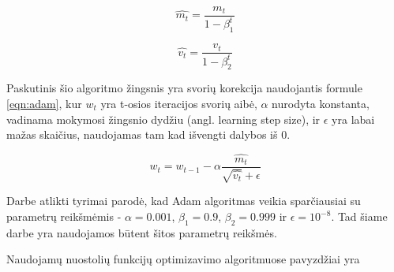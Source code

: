 \begin{equation}
\label{eqn:corr_m_t}
	\hat{m_t} = \dfrac{m_t}{1 - \beta_1^t}
\end{equation}

\begin{equation}
\label{eqn:corr_v_t}
	\hat{v_t} = \dfrac{v_t}{1 - \beta_2^t}
\end{equation}

Paskutinis šio algoritmo žingsnis yra svorių korekcija naudojantis formule \ref{eqn:adam}, kur $w_t$ yra t-osios iteracijos svorių aibė, $\alpha$ nurodyta konstanta, vadinama mokymosi žingsnio dydžiu (angl. learning step size), ir $\epsilon$ yra labai mažas skaičius, naudojamas tam kad išvengti dalybos iš 0.

\begin{equation}
\label{eqn:adam}
	w_t = w_{t-1} - \alpha \dfrac{\hat{m_t}}{\sqrt{\hat{v_t}} + \epsilon}
\end{equation}

Darbe \cite{adam} atlikti tyrimai parodė, kad Adam algoritmas veikia sparčiausiai su parametrų reikšmėmis - $\alpha = 0.001$, $\beta_1 = 0.9$, $\beta_2 = 0.999$ ir $\epsilon = 10^{-8}$. Tad šiame darbe yra naudojamos būtent šitos parametrų reikšmės.

Naudojamų nuostolių funkcijų optimizavimo algoritmuose pavyzdžiai yra 

